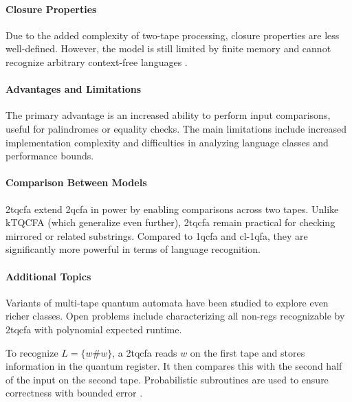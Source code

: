 \paragraph{Closure Properties}  
Due to the added complexity of two-tape processing, closure properties are less well-defined. However, the model is still limited by finite memory and cannot recognize arbitrary context-free languages \cite{li2015hybrid}.

\paragraph{Advantages and Limitations}  
The primary advantage is an increased ability to perform input comparisons, useful for palindromes or equality checks. The main limitations include increased implementation complexity and difficulties in analyzing language classes and performance bounds.

\paragraph{Comparison Between Models}  
\gls{2tqcfa} extend \gls{2qcfa} in power by enabling comparisons across two tapes. Unlike kTQCFA (which generalize even further), \gls{2tqcfa} remain practical for checking mirrored or related substrings. Compared to \gls{1qcfa} and \gls{cl-1qfa}, they are significantly more powerful in terms of language recognition.

\paragraph{Additional Topics}  
Variants of multi-tape quantum automata have been studied to explore even richer classes. Open problems include characterizing all non-\glspl{reg} recognizable by \gls{2tqcfa} with polynomial expected runtime.

\begin{example}
To recognize $L = \{ w \# w \}$, a \gls{2tqcfa} reads $w$ on the first tape and stores information in the quantum register. It then compares this with the second half of the input on the second tape. Probabilistic subroutines are used to ensure correctness with bounded error \cite{zheng2011two}.
\end{example}

\subsubsection{}

